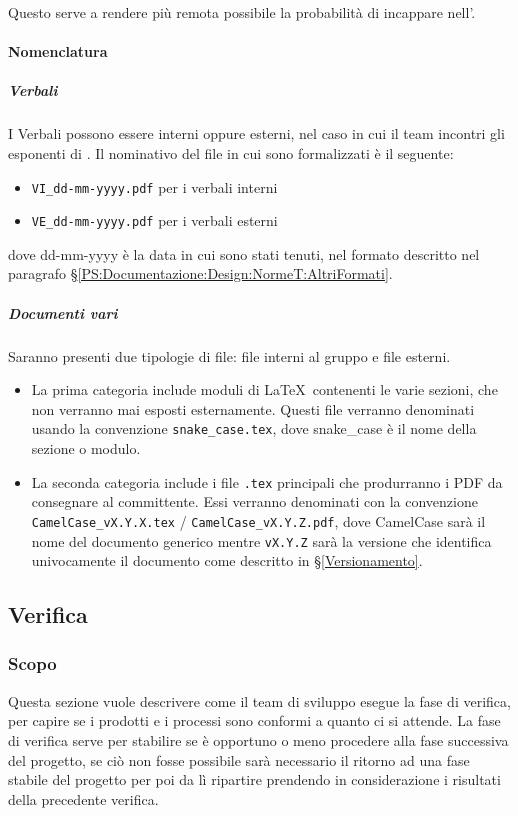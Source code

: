 			Questo serve a rendere più remota possibile la probabilità di incappare nell'.


			\paragraph{Nomenclatura}

			\subparagraph{Verbali}	\label{NomenclaturaVerbali}
			I Verbali  possono essere interni oppure esterni, nel caso in cui il team incontri gli esponenti di \II.
			Il nominativo del file in cui sono formalizzati è il seguente:
			\begin{itemize}
				\item \texttt{VI\_dd-mm-yyyy.pdf} per i verbali interni
				\item \texttt{VE\_dd-mm-yyyy.pdf} per i verbali esterni
			\end{itemize}
			dove dd-mm-yyyy è la data in cui sono stati tenuti, nel formato descritto nel paragrafo \S\ref{PS:Documentazione:Design:NormeT:AltriFormati}.

			\subparagraph{Documenti vari}
			Saranno presenti due tipologie di file: file interni al gruppo e file esterni.
			\begin{itemize}
				\item La prima categoria include moduli di \LaTeX\ contenenti le varie sezioni, che non verranno mai esposti esternamente. Questi file verranno
					denominati usando la convenzione \texttt{snake\_case.tex}, dove snake\_case è il nome della sezione o modulo.
				\item La seconda categoria include i file \texttt{.tex} principali che produrranno i PDF da consegnare al committente. Essi verranno denominati
					con la convenzione \texttt{CamelCase\_vX.Y.X.tex} / \texttt{CamelCase\_vX.Y.Z.pdf}, dove CamelCase sarà il nome del documento generico mentre
					\texttt{vX.Y.Z} sarà la versione che identifica univocamente il documento come descritto in \S\ref{Versionamento}.
			\end{itemize}

	\subsection{Verifica}

		\subsubsection{Scopo}
		Questa sezione vuole descrivere come il team di sviluppo esegue la fase di verifica, per capire se i prodotti e i processi sono conformi a quanto ci si attende. La fase di verifica serve per stabilire se è opportuno o meno procedere alla fase successiva del progetto, se ciò non fosse possibile  sarà necessario il ritorno ad una fase stabile del progetto per poi da lì ripartire prendendo in considerazione i risultati della precedente verifica.

